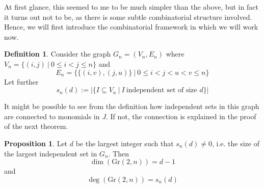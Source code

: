 \documentclass{scrartcl}
\newcommand{\Gr}{\mathrm{Gr}}
\theoremstyle{definition}
\newtheorem{definition}[subsection]{Definition}
\newtheorem{proposition}[subsection]{Proposition}
\begin{document}
At first glance, this seemed to me to be much simpler than the above, but in fact it turns out not to be, as there is some subtle combinatorial structure involved.
Hence, we will first introduce the combinatorial framework in which we will work now.
\begin{definition}
    Consider the graph $G_n = (V_n, E_n)$ where $V_n = \{ (i, j) \ | \ 0 \leq i < j \leq n \}$ and
    \begin{equation*}
        E_n = \{ \{ (i, v), (j, u) \} \ | \ 0 \leq i < j < u < v \leq n \}
    \end{equation*}
    Let further
    \begin{equation*}
        s_n(d) := |\{ I \subseteq V_n \ | \ I \ \text{independent set of size $d$}\}|
    \end{equation*}
\end{definition}
It might be possible to see from the definition how independent sets in this graph are connected to monomials in $J$.
If not, the connection is explained in the proof of the next theorem.
\begin{proposition}
    Let $d$ be the largest integer such that $s_n(d) \neq 0$, i.e. the size of the largest independent set in $G_n$.
    Then
    \begin{equation*}
        \dim(\Gr(2, n)) = d - 1
    \end{equation*}
    and
    \begin{equation*}
        \deg(\Gr(2, n)) = s_n(d)
    \end{equation*}
\end{proposition}
\end{document}
